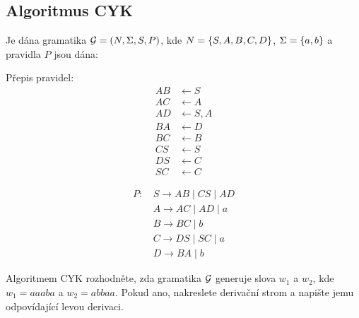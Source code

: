 \subsection{Algoritmus CYK} %
Je dána gramatika $\mathcal{G} = (N, \Sigma, S, P)$, kde
$N = \left\lbrace S, A, B, C, D \right\rbrace$, $\Sigma = \left\lbrace a, b \right\rbrace$ a pravidla $P$ jsou dána:
\begin{multicols}{2}

    Přepis pravidel:
    \begin{align*}
        AB & \leftarrow S \\
        AC & \leftarrow A \\
        AD & \leftarrow S, A \\
        BA & \leftarrow D \\
        BC & \leftarrow B \\
        CS & \leftarrow S \\
        DS & \leftarrow C \\
        SC & \leftarrow C
    \end{align*}

\columnbreak

    \begin{align*}
        P \text{: } & S \rightarrow AB \mid CS \mid AD \\
        & A \rightarrow AC \mid AD \mid a \\
        & B \rightarrow BC \mid b \\
        & C \rightarrow DS \mid SC \mid a \\
        & D \rightarrow BA \mid b
    \end{align*}
\end{multicols}
Algoritmem CYK rozhodněte, zda gramatika $\mathcal{G}$ generuje slova $w_1$ a $w_2$, kde $w_1 = aaaba$ a $w_2 = abbaa$.
Pokud ano, nakreslete derivační strom a napište jemu odpovídající levou derivaci.

